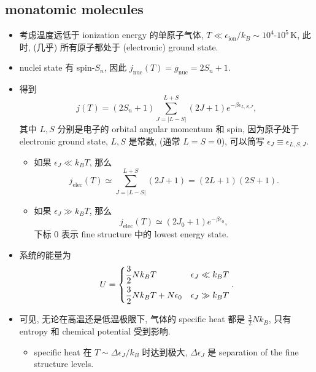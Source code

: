 \subsection{monatomic molecules}
\begin{itemize}
	\item 考虑温度远低于 ionization energy 的单原子气体, $T \ll \epsilon_\text{ion} / k_B \sim 10^4 \text{-} 10^5 \, \text{K}$, 此时, (几乎) 所有原子都处于 (electronic) ground state.
	
	\item nuclei state 有 spin-$S_n$, 因此 $j_\text{nuc}(T) = g_\text{nuc} = 2 S_n + 1$.
	\item 得到
	\begin{equation}
		j(T) = (2 S_n + 1) \sum_{J = |L - S|}^{L + S} (2 J + 1) e^{- \beta \epsilon_{L, S, J}},
	\end{equation}
	其中 $L, S$ 分别是电子的 orbital angular momentum 和 spin, 因为原子处于 electronic ground state, $L, S$ 是常数, (通常 $L = S = 0$), 可以简写 $\epsilon_J \equiv \epsilon_{L, S, J}$.
	\begin{itemize}
		\item 如果 $\epsilon_J \ll k_B T$, 那么
		\begin{equation}
			j_\text{elec}(T) \simeq \sum_{J = |L - S|}^{L + S} (2 J + 1) = (2 L + 1) (2 S + 1).
		\end{equation}
		
		\item 如果 $\epsilon_J \gg k_B T$, 那么
		\begin{equation}
			j_\text{elec}(T) \simeq (2 J_0 + 1) e^{- \beta \epsilon_0},
		\end{equation}
		下标 $0$ 表示 fine structure 中的 lowest energy state.
	\end{itemize}
	
	\item 系统的能量为
	\begin{equation}
		U = \begin{dcases}
			\frac{3}{2} N k_B T & \epsilon_J \ll k_B T \\
			\frac{3}{2} N k_B T + N \epsilon_0 & \epsilon_J \gg k_B T
		\end{dcases}.
	\end{equation}
	
	\item 可见, 无论在高温还是低温极限下, 气体的 specific heat 都是 $\frac{3}{2} N k_B$, 只有 entropy 和 chemical potential 受到影响.
	\begin{itemize}
		\item specific heat 在 $T \sim \Delta \epsilon_J / k_B$ 时达到极大, $\Delta \epsilon_J$ 是 separation of the fine structure levels.
	\end{itemize}
\end{itemize}

